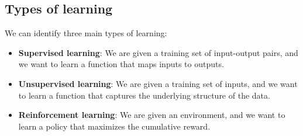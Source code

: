 \subsection{Types of learning}
We can identify three main types of learning:
\begin{itemize}
    \item \textbf{Supervised learning}: We are given a training set of input-output pairs, and we want to learn a function that maps inputs to outputs.
    \item \textbf{Unsupervised learning}: We are given a training set of inputs, and we want to learn a function that captures the underlying structure of the data.
    \item \textbf{Reinforcement learning}: We are given an environment, and we want to learn a policy that maximizes the cumulative reward.
\end{itemize}


